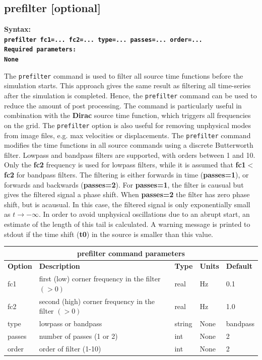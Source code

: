 \documentclass[11pt]{report}
\begin{document}
\subsection{prefilter [optional]}\label{keyword:prefilter}
\begin{flushleft}
\bf
Syntax:\\
\tt prefilter fc1=... fc2=... type=... passes=... order=...\\
\bf 
Required parameters:\\
\rm 
None
\end{flushleft}
The \verb+prefilter+ command is used to filter all source time functions before the simulation
starts. This approach gives the same result as filtering all time-series after the simulation is
completed. Hence, the \verb+prefilter+ command can be used to reduce the amount of post
processing. The command is particularly useful in combination with the {\bf Dirac} source time
function, which triggers all frequencies on the grid. The \verb+prefilter+ option is also useful for
removing unphysical modes from image files, e.g. max velocities or displacements.  The
\verb+prefilter+ command modifies the time functions in all source commands using a discrete
Butterworth filter. Lowpass and bandpass filters are supported, with orders between 1 and 10. Only
the {\bf fc2} frequency is used for lowpass filters, while it is assumed that {\bf fc1}$<${\bf fc2}
for bandpass filters. The filtering is either forwards in time ({\bf passes=1}), or forwards and
backwards ({\bf passes=2}). For {\bf passes=1}, the filter is causual but gives the filtered signal
a phase shift. When {\bf passes=2} the filter has zero phase shift, but is acausual. In this case,
the filtered signal is only exponentially small as $t\to-\infty$. In order to avoid unphysical
oscillations due to an abrupt start, an estimate of the length of this tail is calculated. A warning
message is printed to stdout if the time shift ({\bf t0}) in the source is smaller than this value.
\begin{center}
\begin{tabular}{|l|p{8cm}|l|l|l|} \hline
\multicolumn{5}{|c|}{\bf prefilter command parameters}\\ \hline
\bf{Option} & \bf{Description} & \bf{Type} & \bf{Units} & \bf{Default} \\ 
\hline \hline
fc1 & first (low) corner frequency in the filter $(>0)$   & real  & Hz & 0.1 \\ \hline
fc2 & second (high) corner frequency in the filter $(>0)$ & real  & Hz & 1.0 \\ \hline
type & lowpass or bandpass                                & string & None & bandpass \\ \hline
passes & number of passes (1 or 2) & int & None & 2 \\ \hline
order  & order of filter (1-10) & int & None & 2 \\ \hline
\end{tabular}
\end{center}
\end{document}
